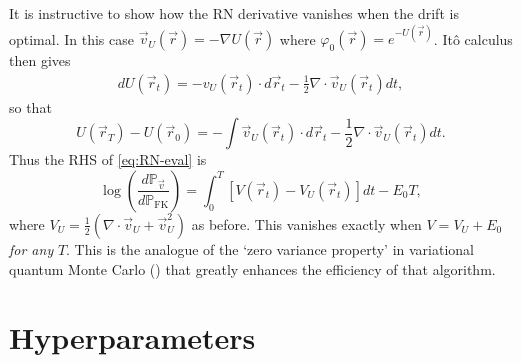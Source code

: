 \documentclass[12pt]{msml2020} %
\newcommand*{\bv}{\vec{v}}
\newcommand*{\br}{\vec{r}}
\begin{document}
It is instructive to show how the RN derivative vanishes when the drift is optimal. In this case $\vec{v}_U(\br) = - \nabla U({\vec{r}})$ where $\varphi_0(\br)=e^{-U(\br)}$. It\^o calculus then gives
%
\begin{align}
dU(\vec{r}_t) = -v_U(\vec{r}_t)\cdot d\vec{r}_t -\frac{1}{2}\nabla\cdot \vec{v}_U(\vec{r}_t)dt,
\end{align}
%
so that
%
$$
U(\vec{r}_T)-U(\vec{r}_0)= - \int \vec{v}_U(\vec{r}_t)\cdot d\vec{r}_t-\frac{1}{2}\nabla\cdot \vec{v}_U(\vec{r}_t) dt.
$$
%
Thus the RHS of \eqref{eq:RN-eval} is
%
%
\begin{equation}\label{eq:ell-alt}
  \log\left(\frac{d\mathbb{P}_{\bv}}{d\mathbb{P}_\text{FK}}\right)=\int_0^T\left[V(\vec{r}_t)-V_U(\vec{r}_t) \right]dt - E_0 T,
\end{equation}
%
where $V_U=\frac{1}{2} \left(\nabla\cdot \vec{v}_U+\vec{v}_U^2\right)$ as before. This vanishes exactly when $V=V_U+E_0$ \emph{for any} $T$. This is the analogue of the `zero variance property' in variational quantum Monte Carlo (\cite{Foulkes:2001aa}) that greatly enhances the efficiency of that algorithm.

\section{Hyperparameters}
\label{sec:hyperparameters}
\end{document}
